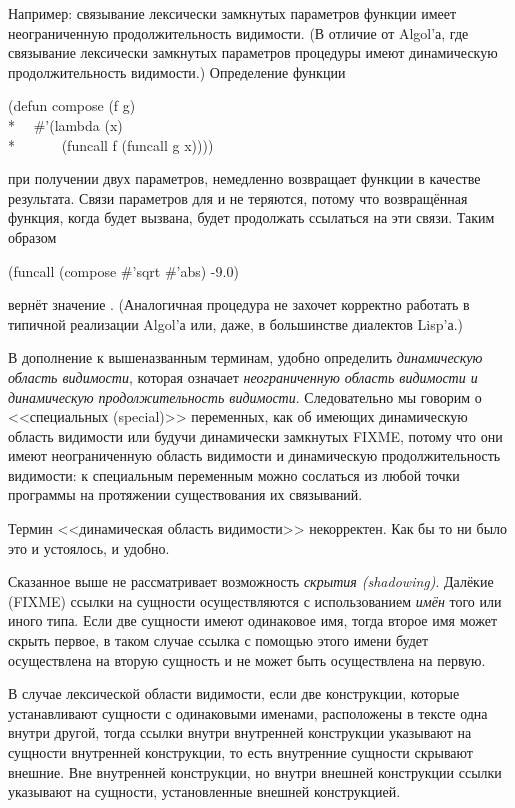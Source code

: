 \begin{itemize}
Например: связывание лексически замкнутых параметров функции имеет неограниченную
продолжительность видимости. (В отличие от Algol'а, где связывание лексически
замкнутых параметров процедуры имеют динамическую продолжительность видимости.)
Определение функции
\begin{lisp}
(defun compose (f g) \\*
~~\#'(lambda (x) \\*
~~~~~~(funcall f (funcall g x))))
\end{lisp}
при получении двух параметров, немедленно возвращает функции в качестве
результата.
Связи параметров для  и  не теряются, потому что возвращённая
функция, когда будет вызвана, будет продолжать ссылаться на эти связи.
Таким образом
\begin{lisp}
(funcall (compose \#'sqrt \#'abs) -9.0)
\end{lisp}
вернёт значение . (Аналогичная процедура не захочет корректно работать в
типичной реализации Algol'а или, даже, в большинстве диалектов Lisp'а.)
\end{itemize}

В дополнение к вышеназванным терминам, удобно определить \emph{динамическую
  область видимости}, которая означает \emph{неограниченную область видимости и
  динамическую продолжительность видимости}. Следовательно мы говорим о
<<специальных (special)>> переменных, как об имеющих динамическую область
видимости или будучи динамически замкнутых FIXME, потому что они имеют
неограниченную область видимости и динамическую продолжительность видимости:
к специальным переменным можно сослаться из любой точки программы на протяжении
существования их связываний.

\begin{newer}
Термин <<динамическая область видимости>> некорректен. Как бы то ни было это и
устоялось, и удобно.
\end{newer}

Сказанное выше не рассматривает возможность \emph{скрытия (shadowing)}. Далёкие
(FIXME) ссылки на сущности осуществляются с
использованием \emph{имён} того или иного типа. Если две сущности имеют
одинаковое имя, тогда второе имя может скрыть первое, в таком случае ссылка с
помощью этого имени будет осуществлена на вторую сущность и не может быть
осуществлена на первую.

В случае лексической области видимости,
если две конструкции, которые устанавливают сущности с одинаковыми именами,
расположены в тексте одна внутри другой, тогда ссылки внутри внутренней
конструкции указывают на сущности внутренней конструкции, то есть внутренние
сущности скрывают внешние. Вне внутренней конструкции, но внутри внешней
конструкции ссылки указывают на сущности, установленные внешней конструкцией.

